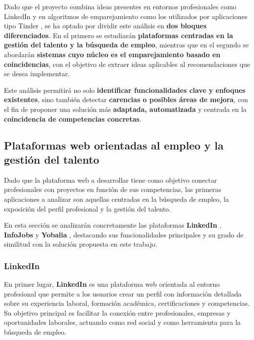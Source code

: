 Dado que el proyecto combina ideas presentes en entornos profesionales como LinkedIn \cite{linkedin}
y en algoritmos de emparejamiento como los utilizados por aplicaciones tipo Tinder \cite{tinder}, se 
ha optado por dividir este análisis en \textbf{dos bloques diferenciados}. En el primero se 
estudiarán \textbf{plataformas centradas en la gestión del talento y la búsqueda de empleo}, 
mientras que en el segundo se abordarán \textbf{sistemas cuyo núcleo es el emparejamiento 
basado en coincidencias}, con el objetivo de extraer ideas aplicables al 
\gls{recomendaciones} que se desea implementar.

Este análisis permitirá no solo \textbf{identificar funcionalidades clave y enfoques existentes}, 
sino también detectar \textbf{carencias o posibles áreas de mejora}, con el fin de proponer 
una solución más \textbf{adaptada, automatizada} y centrada en la 
\textbf{coincidencia de competencias concretas}.

\subsection{Plataformas web orientadas al empleo y la gestión del talento}

Dado que la plataforma web a desarrollar tiene como objetivo conectar profesionales con 
proyectos en función de sus competencias, las primeras aplicaciones a analizar son aquellas 
centradas en la búsqueda de empleo, la exposición del perfil profesional y la gestión del talento.

En esta sección se analizarán concretamente las plataformas \textbf{LinkedIn} \cite{linkedin}, 
\textbf{InfoJobs} \cite{infojobs} y \textbf{Yobalia} \cite{yobalia}, destacando sus funcionalidades principales y su grado 
de similitud con la solución propuesta en este trabajo.

\subsubsection{LinkedIn}

En primer lugar, \textbf{LinkedIn} \cite{linkedin} es una plataforma web orientada al entorno 
profesional que permite a los usuarios crear un perfil con información detallada sobre su 
experiencia laboral, formación académica, certificaciones y competencias. Su objetivo 
principal es facilitar la conexión entre profesionales, empresas y oportunidades laborales, 
actuando como red social y como herramienta para la búsqueda de empleo.

